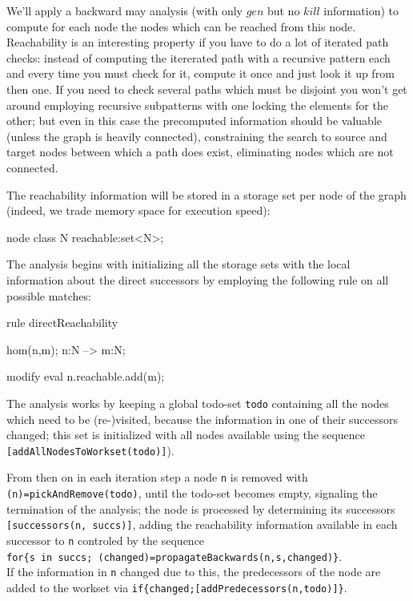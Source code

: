 We'll apply a backward may analysis (with only $gen$ but no $kill$ information) to compute for each node the nodes which can be reached from this node.
Reachability is an interesting property if you have to do a lot of iterated path checks:
instead of computing the itererated path with a recursive pattern each and every time you must check for it,
compute it once and just look it up from then one.
If you need to check several paths which must be disjoint you won't get around employing recursive subpatterns with one locking the elements for the other; but even in this case the precomputed information should be valuable (unless the graph is heavily connected), constraining the search to source and target nodes between which a path does exist, eliminating nodes which are not connected.

The reachability information will be stored in a storage set per node of the graph (indeed, we trade memory space for execution speed):
  \begin{example}
    \begin{grgen}
node class N
{
	reachable:set<N>;
}
    \end{grgen}
  \end{example}

The analysis begins with initializing all the storage sets with the local information about the direct successors by employing the following rule on all possible matches:
  \begin{example}
    \begin{grgen}
rule directReachability
{
  hom(n,m);
  n:N --> m:N;

  modify {
    eval { n.reachable.add(m); }
  }
}
    \end{grgen}
  \end{example}

The analysis works by keeping a global todo-set \verb#todo# containing all the nodes which need to be (re-)visited,
because the information in one of their successors changed;
this set is initialized with all nodes available using the sequence \verb#[addAllNodesToWorkset(todo)]#).

From then on in each iteration step a node \verb#n# is removed with \verb#(n)=pickAndRemove(todo)#, until the todo-set becomes empty, signaling the termination of the analysis; the node is processed by determining its successors \verb#[successors(n, succs)]#, adding the reachability information available in each successor to \verb#n# controled by the sequence\\
\verb#for{s in succs; (changed)=propagateBackwards(n,s,changed)}#.\\
If the information in \verb#n# changed due to this, the predecessors of the node are added to the workset via \verb#if{changed;[addPredecessors(n,todo)]}#.

